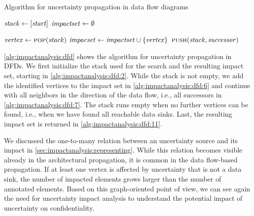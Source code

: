 \begin{algorithm}
    \caption{Algorithm for uncertainty propagation in data flow diagrams}
    \label{alg:impactanalysis:dfd}
    \begin{algorithmic}[1] 
            \algindentskip
            \State $\mathit{stack} \gets [\mathit{start}]$  \label{alg:impactanalysis:dfd:2}
            \State $\mathit{impactset} \gets \emptyset$ 
            \algblockskip

             \label{alg:impactanalysis:dfd:4}
                \State $\mathit{vertex} \gets \textsc{pop}(\mathit{stack})$
                \State $\mathit{impacset} \gets \mathit{impactset} \cup \{ \mathit{vertex} \}$  \label{alg:impactanalysis:dfd:6} 
                 \label{alg:impactanalysis:dfd:7}
                    \State $\textsc{push}(\mathit{stack}, \mathit{successor})$
                \EndFor
            \EndWhile
            \algblockskip

            \State {} \label{alg:impactanalysis:dfd:11}
            \algindentskip
        \EndProcedure
    \end{algorithmic}
\end{algorithm}

\autoref{alg:impactanalysis:dfd} shows the algorithm for uncertainty propagation in \acp{DFD}.
We first initialize the stack used for the search and the resulting impact set, starting in \autoref{alg:impactanalysis:dfd:2}.
While the stack is not empty, we add the identified vertices to the impact set in \autoref{alg:impactanalysis:dfd:6} and continue with all neighbors in the direction of the data flow, i.e., all successors in \autoref{alg:impactanalysis:dfd:7}.
The stack runs empty when no further vertices can be found, i.e., when we have found all reachable data sinks.
Last, the resulting impact set is returned in \autoref{alg:impactanalysis:dfd:11}.

We discussed the one-to-many relation between an uncertainty source and its impact in \autoref{sec:impactanalysis:representing}.
While this relation becomes visible already in the architectural propagation, it is common in the data flow-based propagation.
If at least one vertex is affected by uncertainty that is not a data sink, the number of impacted elements grows larger than the number of annotated elements.
Based on this graph-oriented point of view, we can see again the need for uncertainty impact analysis to understand the potential impact of uncertainty on confidentiality.





